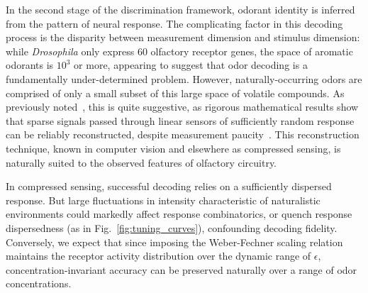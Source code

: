 In the second stage of the discrimination framework, odorant identity is inferred from the pattern of neural response. The complicating factor in this decoding process is the disparity between measurement dimension and stimulus dimension: while \textit{Drosophila} only express 60 olfactory receptor genes, the space of aromatic odorants is $10^3$ or more, appearing to suggest that odor decoding is a fundamentally under-determined problem. However, naturally-occurring odors are comprised of only a small subset of this large space of volatile compounds. As previously noted~\cite{vijay_1}, this is quite suggestive, as rigorous mathematical results show that sparse signals passed through linear sensors of sufficiently random response can be reliably reconstructed, despite measurement paucity~\cite{CS_donoho, CS_tao, CS_ganguli}. %
This reconstruction technique, known in computer vision and elsewhere as compressed sensing, is naturally suited to the observed features of olfactory circuitry. %

In compressed sensing, successful decoding relies on a sufficiently dispersed response. But large fluctuations in intensity characteristic of naturalistic environments could markedly affect response combinatorics, or quench response dispersedness (as in Fig.~\ref{fig:tuning_curves}), confounding decoding fidelity. Conversely, we expect that since imposing the Weber-Fechner scaling relation maintains the receptor activity distribution over the dynamic range of $\epsilon$, concentration-invariant accuracy can be preserved naturally over a range of odor concentrations.

